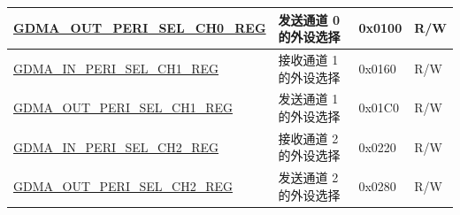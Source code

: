 \begin{longtable}{ | L{6.4cm} | L{6.5cm} | L{1.3cm} | L{1.3cm} | }
\hyperref[regdesc:GDMAOUTPERISELCHNREG]{GDMA\_OUT\_PERI\_SEL\_CH0\_REG} & 发送通道 0 的外设选择 & 0x0100 & R/W \\ \hline
\hyperref[regdesc:GDMAINPERISELCHNREG]{GDMA\_IN\_PERI\_SEL\_CH1\_REG} & 接收通道 1 的外设选择 & 0x0160 & R/W \\ \hline
\hyperref[regdesc:GDMAOUTPERISELCHNREG]{GDMA\_OUT\_PERI\_SEL\_CH1\_REG} & 发送通道 1 的外设选择 & 0x01C0 & R/W \\ \hline
\hyperref[regdesc:GDMAINPERISELCHNREG]{GDMA\_IN\_PERI\_SEL\_CH2\_REG} & 接收通道 2 的外设选择 & 0x0220 & R/W \\ \hline
\hyperref[regdesc:GDMAOUTPERISELCHNREG]{GDMA\_OUT\_PERI\_SEL\_CH2\_REG} & 发送通道 2 的外设选择 & 0x0280 & R/W \\ \hline
\end{longtable}
